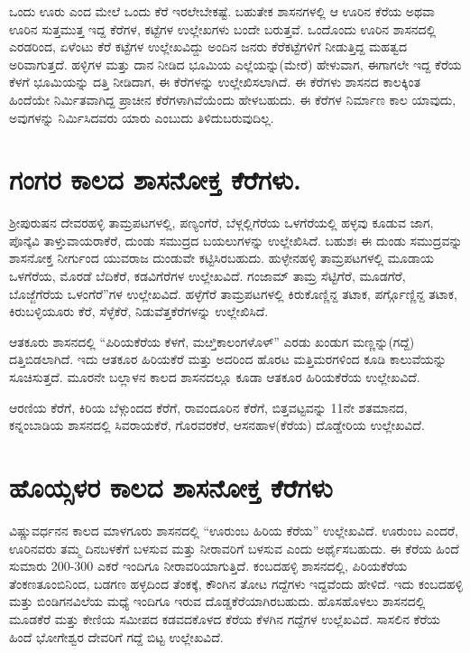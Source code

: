 ಒಂದು ಊರು ಎಂದ ಮೇಲೆ ಒಂದು ಕೆರೆ ಇರಲೇಬೇಕಷ್ಟೆ. ಬಹುತೇಕ ಶಾಸನಗಳಲ್ಲಿ ಆ ಊರಿನ ಕೆರೆಯ ಅಥವಾ ಊರಿನ ಸುತ್ತಮುತ್ತ ಇದ್ದ ಕೆರೆಗಳ, ಕಟ್ಟೆಗಳ ಉಲ್ಲೇಖಗಳು ಬಂದೇ ಬರುತ್ತವೆ. ಒಂದೊಂದು ಊರಿನ ಶಾಸನದಲ್ಲಿ ಎರಡರಿಂದ, ಏಳೆಂಟು ಕೆರೆ ಕಟ್ಟೆಗಳ ಉಲ್ಲೇಖವಿದ್ದು ಅಂದಿನ ಜನರು ಕೆರೆಕಟ್ಟೆಗಳಿಗೆ ನೀಡುತ್ತಿದ್ದ ಮಹತ್ವದ ಅರಿವಾಗುತ್ತದೆ. ಹಳ್ಳಿಗಳ ಮತ್ತು ದಾನ ನೀಡಿದ ಭೂಮಿಯ ಎಲ್ಲೆಯನ್ನು(ಮೇರೆ) ಹೇಳುವಾಗ, ಈಗಾಗಲೇ ಇದ್ದ ಕೆರೆಯ ಕೆಳಗೆ ಭೂಮಿಯನ್ನು ದತ್ತಿ ನೀಡಿದಾಗ, ಈ ಕೆರೆಗಳನ್ನು ಉಲ್ಲೇಖಿಸಲಾಗಿದೆ. ಈ ಕೆರೆಗಳು ಶಾಸನದ ಕಾಲಕ್ಕಿಂತ ಹಿಂದೆಯೇ ನಿರ್ಮಿತವಾಗಿದ್ದ ಪ್ರಾಚೀನ ಕೆರೆಗಳಾಗಿವೆಯೆಂದು ಹೇಳಬಹುದು. ಈ ಕೆರೆಗಳ ನಿರ್ಮಾಣ ಕಾಲ ಯಾವುದು, ಅವುಗಳನ್ನು ನಿರ್ಮಿಸಿದವರು ಯಾರು ಎಂಬುದು ತಿಳಿದುಬರುವುದಿಲ್ಲ.


\section{ಗಂಗರ ಕಾಲದ ಶಾಸನೋಕ್ತ ಕೆರೆಗಳು.}

ಶ‍್ರೀಪುರುಷನ ದೇವರಹಳ್ಳಿ ತಾಮ್ರಪಟಗಳಲ್ಲಿ, ಪಣ್ಯಂಗೆರೆ, ಬೆಳ್ಗಲ್ಲಿಗೆರೆಯ ಒಳಗೆರೆಯಲ್ಲಿ ಹಳ್ಳವು ಕೂಡುವ ಜಾಗ, ಪೊನ್ಕೆವಿ ತಾಳ್ತುವಾಯರಾಕೆರೆ, ದುಂಡು ಸಮುದ್ರದ ಬಯಲುಗಳನ್ನು ಉಲ್ಲೇಖಿಸಿದೆ. ಬಹುಶಃ ಈ ದುಂಡು ಸಮುದ್ರವನ್ನು ಶಾಸನೋಕ್ತ ನೀರ್ಗುಂದ ಯುವರಾಜ ದುಂಡುವೇ ಕಟ್ಟಿಸಿರಬಹುದು. ಹುಳ್ಳೇನಹಳ್ಳಿ ತಾಮ್ರಪಟಗಳಲ್ಲಿ ಮೂಡಾಯ ಒಳಗೆರೆಯ, ಮೊರಡೆ ಬೆದಿಕೆರೆ, ಕಡವಿಗೆರೆಗಳ ಉಲ್ಲೇಖವಿದೆ. ಗಂಜಾಮ್ ತಾಮ್ರ ಸೆಟ್ಟಿಗೆರೆ, ಮೂಡಗೆರೆ, ಬೊಜ್ಜೆಗೆರೆಯ ಒಳಂಗೆರೆ”ಗಳ ಉಲ್ಲೇಖವಿದೆ. ಹಳ್ಳೆಗೆರೆ ತಾಮ್ರಪಟಗಳಲ್ಲಿ ಕಿರುಕೊಣ್ಣಿನ್ದ ತಟಾಕ, ಪರ್ಗ್ಗೊಣ್ಣಿನ್ದ ತಟಾಕ, ಕಿರುಬಳ್ಳಿಯೂರು ಕೆರೆ, ಸೆಳ್ಳೆಕೆರೆ, ನಿಡುವೆತ್ತಕೆರೆಗಳನ್ನು ಉಲ್ಲೇಖಿಸಿದೆ.

ಆತಕೂರು ಶಾಸನದಲ್ಲಿ “ಪಿರಿಯಕೆರೆಯ ಕೆಳಗೆ, ಮೞ್ತಿಕಾಲಂಗಳೊಳ್​” ಎರಡು ಖಂಡುಗ ಮಣ್ಣನ್ನು(ಗದ್ದೆ) ದತ್ತಿಬಿಡಲಾಗಿದೆ. ಇದು ಆತಕೂರ ಹಿರಿಯಕೆರೆ ಮತ್ತು ಅದರಿಂದ ಹೊರಟ ಮತ್ತಿಮರಗಳಿಂದ ಕೂಡಿ ಕಾಲುವೆಯನ್ನು ಸೂಚಿಸುತ್ತದೆ. ಮೂರನೇ ಬಲ್ಲಾಳನ ಕಾಲದ ಶಾಸನದಲ್ಲೂ ಕೂಡಾ ಆತಕೂರ ಹಿರಿಯಕೆರೆಯ ಉಲ್ಲೇಖವಿದೆ.

ಆರಣಿಯ ಕೆರೆಗೆ, ಕಿರಿಯ ಬೆಳ್ಗುಂದದ ಕೆರೆಗೆ, ರಾವಂದೂರಿನ ಕೆರೆಗೆ, ಬಿತ್ತವಟ್ಟವನ್ನು 11ನೇ ಶತಮಾನದ, ಕನ್ನಂಬಾಡಿಯ ಶಾಸನದಲ್ಲಿ ಸಿವರಾಯಕೆರೆ, ಗೊರವರಕೆರೆ, ಆಸನಹಾಳ(ಕೆರೆಯ) ದೊಡ್ಡೇರಿಯ ಉಲ್ಲೇಖವಿದೆ.


\section{ಹೊಯ್ಸಳರ ಕಾಲದ ಶಾಸನೋಕ್ತ ಕೆರೆಗಳು}

ವಿಷ್ಣುವರ್ಧನನ ಕಾಲದ ಮಾಳಗೂರು ಶಾಸನದಲ್ಲಿ “ಊರುಂಬ ಹಿರಿಯ ಕೆರೆಯ” ಉಲ್ಲೇಖವಿದೆ. ಊರುಂಬ ಎಂದರೆ, ಊರಿನವರು ತಮ್ಮ ದಿನಬಳಕೆಗೆ ಬಳಸುವ ಮತ್ತು ನೀರಾವರಿಗೆ ಬಳಸುವ ಎಂದು ಅರ್ಥೈಸಬಹುದು. ಈ ಕೆರೆಯ ಹಿಂದೆ ಸುಮಾರು 200-300 ಎಕರೆ ಇಂದಿಗೂ ನೀರಾವರಿಯಾಗುತ್ತಿದೆ. ಕಂಬದಹಳ್ಳಿ ಶಾಸನದಲ್ಲಿ, ಪಿರಿಯಕೆರೆಯ ತೆಂಕಣತೂಂಬಿನಿಂದ, ಬಡಗಣ ಹಳ್ಳದಿಂದ ತೆಂಕಕ್ಕೆ, ಕೌಂಗಿನ ತೋಟ ಗದ್ದೆಗಳು ಇದ್ದವೆಂದು ಹೇಳಿದೆ. ಇದು ಕಂಬದಹಳ್ಳಿ ಮತ್ತು ಬಿಂಡಿಗನವಿಲೆಯ ಮಧ್ಯೆ ಇಂದಿಗೂ ಇರುವ ದೊಡ್ಡಕೆರೆಯಾಗಿರಬಹುದು. ಹೊಸಹೊಳಲು ಶಾಸನದಲ್ಲಿ ಮೂಡಕೆರೆ ಮತ್ತು ಕೇಣಿಯ ಸಮೀಪದ ಕಡವದಕೊಳದ ಕೆರೆಯ ಕೆಳಗಿನ ಗದ್ದೆಗಳ ಉಲ್ಲೆಖವಿದೆ. ಸಾಸಲಿನ ಕೆರೆಯ ಹಿಂದೆ ಭೋಗೇಶ್ವರ ದೇವರಿಗೆ ಗದ್ದೆ ಬಿಟ್ಟ ಉಲ್ಲೇಖವಿದೆ.

